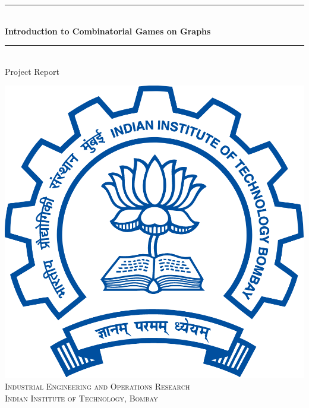 \documentclass[a4paper,12pt]{article}
\begin{document}
	
	\begin{titlepage}
		
		\newcommand{\HRule}{\rule{\linewidth}{0.5mm}} %
		
		
		
		\center %
		
		
		\HRule \\[0.4cm]
		{ \huge \bfseries Introduction to Combinatorial Games on Graphs}\\[0.4cm] %
		\HRule \\[0.5cm]
		
		{Project Report}\\[1cm]
		
		\vspace*{1.8cm}
		
		
		\includegraphics[scale=0.13]{logo.png}\\[1cm] %
		\textsc{\large Industrial Engineering and Operations Research\\
			Indian Institute of Technology, Bombay}\\[1.5cm] %
		

\end{titlepage}
\end{document}
